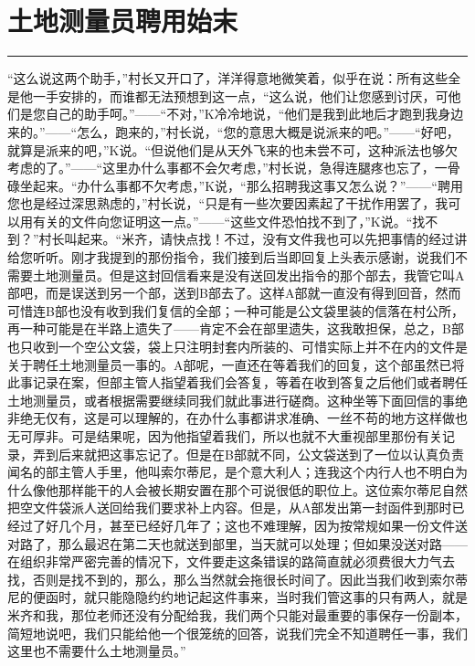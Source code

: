 \documentclass[12pt,a4paper]{article}
\begin{document}
\section{土地测量员聘用始末}
\vspace{0.5em}
\vspace{0.3em}

\noindent\rule{\textwidth}{0.4pt}

\vspace{0.3em}



“这么说这两个助手，”村长又开口了，洋洋得意地微笑着，似乎在说：所有这些全是他一手安排的，而谁都无法预想到这一点，“这么说，他们让您感到讨厌，可他们是您自己的助手呵。”——“不对，”K冷冷地说，“他们是我到此地后才跑到我身边来的。”——“怎么，跑来的，”村长说，“您的意思大概是说派来的吧。”——“好吧，就算是派来的吧，”K说。“但说他们是从天外飞来的也未尝不可，这种派法也够欠考虑的了。”——“这里办什么事都不会欠考虑，”村长说，急得连腿疼也忘了，一骨碌坐起来。“办什么事都不欠考虑，”K说，“那么招聘我这事又怎么说？”——“聘用您也是经过深思熟虑的，”村长说，“只是有一些次要因素起了干扰作用罢了，我可以用有关的文件向您证明这一点。”——“这些文件恐怕找不到了，”K说。“找不到？”村长叫起来。“米齐，请快点找！不过，没有文件我也可以先把事情的经过讲给您听听。刚才我提到的那份指令，我们接到后当即回复上头表示感谢，说我们不需要土地测量员。但是这封回信看来是没有送回发出指令的那个部去，我管它叫A部吧，而是误送到另一个部，送到B部去了。这样A部就一直没有得到回音，然而可惜连B部也没有收到我们复信的全部；一种可能是公文袋里装的信落在村公所，再一种可能是在半路上遗失了——肯定不会在部里遗失，这我敢担保，总之，B部也只收到一个空公文袋，袋上只注明封套内所装的、可惜实际上并不在内的文件是关于聘任土地测量员一事的。A部呢，一直还在等着我们的回复，这个部虽然已将此事记录在案，但部主管人指望着我们会答复，等着在收到答复之后他们或者聘任土地测量员，或者根据需要继续同我们就此事进行磋商。这种坐等下面回信的事绝非绝无仅有，这是可以理解的，在办什么事都讲求准确、一丝不苟的地方这样做也无可厚非。可是结果呢，因为他指望着我们，所以也就不大重视部里那份有关记录，弄到后来就把这事忘记了。但是在B部就不同，公文袋送到了一位以认真负责闻名的部主管人手里，他叫索尔蒂尼，是个意大利人；连我这个内行人也不明白为什么像他那样能干的人会被长期安置在那个可说很低的职位上。这位索尔蒂尼自然把空文件袋派人送回给我们要求补上内容。但是，从A部发出第一封函件到那时已经过了好几个月，甚至已经好几年了；这也不难理解，因为按常规如果一份文件送对路了，那么最迟在第二天也就送到部里，当天就可以处理；但如果没送对路——在组织非常严密完善的情况下，文件要走这条错误的路简直就必须费很大力气去找，否则是找不到的，那么，那么当然就会拖很长时间了。因此当我们收到索尔蒂尼的便函时，就只能隐隐约约地记起这件事来，当时我们管这事的只有两人，就是米齐和我，那位老师还没有分配给我，我们两个只能对最重要的事保存一份副本，简短地说吧，我们只能给他一个很笼统的回答，说我们完全不知道聘任一事，我们这里也不需要什么土地测量员。”
\end{document}
